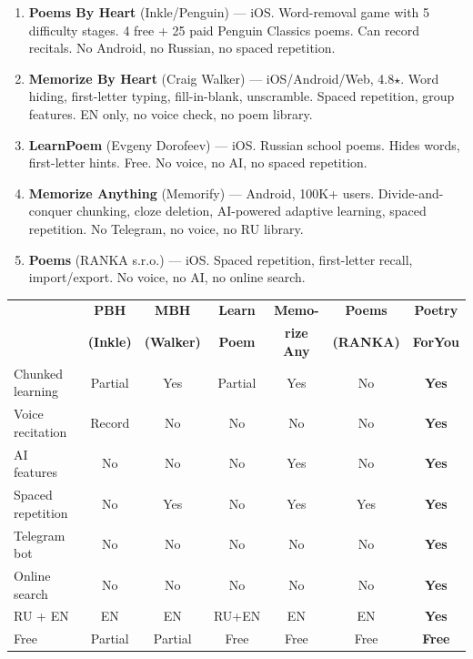\documentclass[11pt, a4paper]{article}
\begin{document}
\begin{enumerate}
    \item \textbf{Poems By Heart} (Inkle/Penguin) --- iOS. Word-removal game with 5 difficulty stages. 4 free + 25 paid Penguin Classics poems. Can record recitals. No Android, no Russian, no spaced repetition.
    \item \textbf{Memorize By Heart} (Craig Walker) --- iOS/Android/Web, 4.8$\star$. Word hiding, first-letter typing, fill-in-blank, unscramble. Spaced repetition, group features. EN only, no voice check, no poem library.
    \item \textbf{LearnPoem} (Evgeny Dorofeev) --- iOS. Russian school poems. Hides words, first-letter hints. Free. No voice, no AI, no spaced repetition.
    \item \textbf{Memorize Anything} (Memorify) --- Android, 100K+ users. Divide-and-conquer chunking, cloze deletion, AI-powered adaptive learning, spaced repetition. No Telegram, no voice, no RU library.
    \item \textbf{Poems} (RANKA s.r.o.) --- iOS. Spaced repetition, first-letter recall, import/export. No voice, no AI, no online search.
\end{enumerate}

\begin{center}
\footnotesize
\begin{tabularx}{\textwidth}{l|c|c|c|c|c|c}
\toprule
 & \textbf{PBH} & \textbf{MBH} & \textbf{Learn} & \textbf{Memo-} & \textbf{Poems} & \textbf{Poetry} \\
 & \textbf{(Inkle)} & \textbf{(Walker)} & \textbf{Poem} & \textbf{rize Any} & \textbf{(RANKA)} & \textbf{ForYou} \\
\midrule
Chunked learning & Partial & Yes & Partial & Yes & No & \textbf{Yes} \\
Voice recitation & Record & No & No & No & No & \textbf{Yes} \\
AI features & No & No & No & Yes & No & \textbf{Yes} \\
Spaced repetition & No & Yes & No & Yes & Yes & \textbf{Yes} \\
Telegram bot & No & No & No & No & No & \textbf{Yes} \\
Online search & No & No & No & No & No & \textbf{Yes} \\
RU + EN & EN & EN & RU+EN & EN & EN & \textbf{Yes} \\
Free & Partial & Partial & Free & Free & Free & \textbf{Free} \\
\bottomrule
\end{tabularx}
\end{center}
\end{document}
